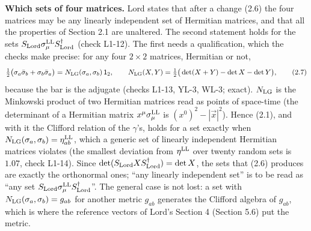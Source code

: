 \documentclass[
  10pt,
]{article}
\begin{document}
\textbf{Which sets of four matrices.} Lord states that after a change
(2.6) the four matrices may be any linearly independent set of Hermitian
matrices, and that all the properties of Section 2.1 are unaltered. The
second statement holds for the sets
\(S_{\rm Lord}\sigma^{\rm LL}_\mu S_{\rm Lord}^\dagger\) (check L1-12).
The first needs a qualification, which the checks make precise: for any
four \(2\times2\) matrices, Hermitian or not,
\[\tfrac12\big(\sigma_a\bar\sigma_b+\sigma_b\bar\sigma_a\big)=N_{\rm LG}(\sigma_a,\sigma_b)\,\mathsf 1_2,\qquad N_{\rm LG}(X,Y)=\tfrac12\big(\det(X+Y)-\det X-\det Y\big),\tag{2.7}\]
because the bar is the adjugate (checks L1-13, YL-3, WL-3; exact).
\(N_{\rm LG}\) is the Minkowski product of two Hermitian matrices read
as points of space-time (the determinant of a Hermitian matrix
\(x^\mu\sigma^{\rm LL}_\mu\) is \((x^0)^2-|\vec x|^2\)). Hence (2.1),
and with it the Clifford relation of the \(\gamma\)'s, holds for a set
exactly when \(N_{\rm LG}(\sigma_a,\sigma_b)=\eta^{\rm LL}_{ab}\), which
a generic set of linearly independent Hermitian matrices violates (the
smallest deviation from \(\eta^{\rm LL}\) over twenty random sets is
\(1.07\), check L1-14). Since
\(\det(S_{\rm Lord}XS^\dagger_{\rm Lord})=\det X\), the sets that (2.6)
produces are exactly the orthonormal ones; ``any linearly independent
set'' is to be read as ``any set
\(S_{\rm Lord}\sigma^{\rm LL}_\mu S_{\rm Lord}^\dagger\)''. The general
case is not lost: a set with \(N_{\rm LG}(\sigma_a,\sigma_b)=g_{ab}\)
for another metric \(g_{ab}\) generates the Clifford algebra of
\(g_{ab}\), which is where the reference vectors of Lord's Section 4
(Section 5.6) put the metric.
\end{document}
